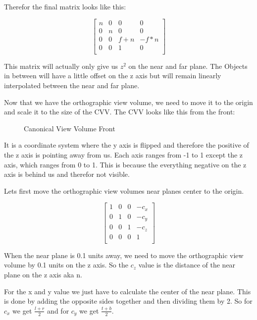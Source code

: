 \documentclass[12pt]{report} \usepackage{preamble}
\begin{document}
Therefor the final matrix looks like this:

\[
	\begin{bmatrix}
		n & 0 & 0     & 0      \\
		0 & n & 0     & 0      \\
		0 & 0 & f + n & -f * n \\
		0 & 0 & 1     & 0      \\
	\end{bmatrix}
\]

This matrix will actually only give us \(z^2\) on the near and far plane. The Objects in between will have
a little offset on the z axis but will remain linearly interpolated between the near and far plane.

Now that we have the orthographic view volume, we need to move it to the origin and scale it to the size of the CVV.
The CVV looks like this from the front:

\begin{figure}[hbtp]
	\centering 
	\caption{Canonical View Volume Front}
\end{figure} \FloatBarrier

It is a coordinate system where the y axis is flipped and therefore the positive of the z axis is pointing away from us.
Each axis ranges from -1 to 1 except the z axis, which ranges from 0 to 1. This is because the everything negative on the z axis
is behind us and therefor not visible.

Lets first move the orthographic view volumes near planes center to the origin.

\[
	\begin{bmatrix}
		1 & 0 & 0 & -c_x \\
		0 & 1 & 0 & -c_y \\
		0 & 0 & 1 & -c_z \\
		0 & 0 & 0 & 1    \\
	\end{bmatrix}
\]


When the near plane is 0.1 units away, we need to move the orthographic view volume by 0.1 units on the z axis.
So the \(c_z\) value is the distance of the near plane on the z axis aka n.

For the x and y value we just have to calculate the center of the near plane. This is done by adding the opposite
sides together and then dividing them by 2. So for \(c_x\) we get \(\frac{l + r}{2}\) and for \(c_y\) we get \(\frac{t + b}{2}\).
\end{document}
